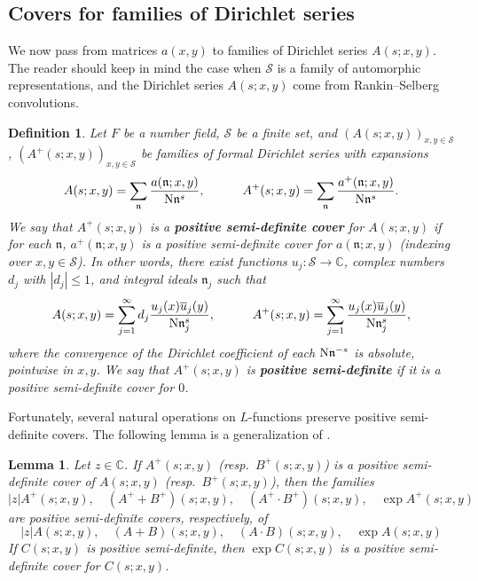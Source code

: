 \documentclass[11pt]{amsart}
\newtheorem{lemma}[theorem]{Lemma}
\newtheorem{definition}[theorem]{Definition}
\theoremstyle{remark}
\numberwithin{equation}{section}
\newcommand{\n}{\mathfrak{n}}
\newcommand{\N}{\textnormal{N}}
\newcommand{\mS}{\mathcal{S}}
\renewcommand{\bar}{\overline}
\begin{document}
\subsection{Covers for families of Dirichlet series} 
We now pass from matrices $a(x, y)$ to families of Dirichlet series $A(s; x, y)$. The reader should keep in mind the case when $\mS$ is a family of automorphic representations, and the Dirichlet series $A(s; x, y)$ come from Rankin--Selberg convolutions.

\begin{definition} \label{def:covers-l-functions}
Let $F$ be a number field, $\mS$ be a finite set, and $(A(s; x, y))_{x, y \in \mS}$, $(A^+(s; x, y))_{x, y \in \mS}$ be families of formal Dirichlet series with expansions
    \[
        A(s; x, y) = \sum_\n \frac{a(\n; x, y)}{\N \n^s},
        \qquad\quad 
        A^+(s; x, y) = \sum_\n \frac{a^+(\n; x, y)}{\N \n^s}.
    \]
    We say that $A^+(s; x, y)$ is a {\bf positive semi-definite cover} for $A(s; x, y)$ if for each $\n$, $a^+(\n; x, y)$ is a positive semi-definite cover for $a(\n; x, y)$ (indexing over $x, y \in \mS$). In other words, there exist functions $u_j : \mS \to \mathbb{C}$, complex numbers $d_j$ with $|d_j| \le 1$, and integral ideals $\n_j$ such that
    \[
        A(s; x, y) = \sum_{j=1}^\infty d_j \frac{u_j(x) \bar u_j(y)}{\N \n_j^s},
        \qquad\quad 
        A^+(s; x, y) = \sum_{j=1}^\infty \frac{u_j(x) \bar u_j(y)}{\N \n_j^s},
    \]
    where the convergence of the Dirichlet coefficient of each $\N \n^{-s}$ is absolute, pointwise in $x, y$. We say that $A^+(s; x, y)$ is {\bf positive semi-definite} if it is a positive semi-definite cover for $0$.
\end{definition}


Fortunately, several natural operations on $L$-functions preserve positive semi-definite covers.  The following lemma is a generalization of \cite[Lemma 3]{lichtman2024density}.

\begin{lemma} \label{lem:nondef-l-functions}
    Let $z \in \mathbb{C}$. 
    If $A^+(s; x, y)$ (resp.\ $B^+(s; x, y)$) is a positive semi-definite cover of $A(s; x, y)$ (resp.\ $B^+(s; x, y)$), then the families
    \[
        |z| A^+(s; x, y),
        \quad 
        (A^+ + B^+)(s; x, y),
        \quad 
        (A^+ \cdot B^+)(s; x, y),
        \quad
        \exp A^+(s; x, y)
    \]
    are positive semi-definite covers, respectively, of
    \[
        |z| A(s; x, y),
        \quad 
        (A + B)(s; x, y),
        \quad 
        (A \cdot B)(s; x, y),
        \quad
        \exp A(s; x, y)
    \]
    If $C(s; x, y)$ is positive semi-definite, then $\exp C(s; x, y)$ is a positive semi-definite cover for $C(s; x, y)$.
\end{lemma}
\end{document}
